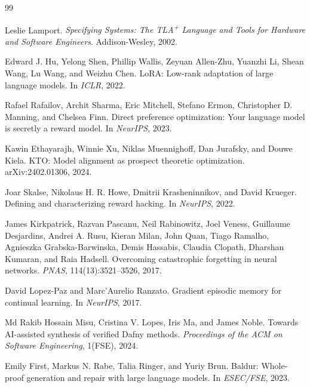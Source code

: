 \documentclass[11pt]{article}
\begin{document}

\begin{thebibliography}{99}

Leslie Lamport.
\newblock \emph{Specifying Systems: The TLA\textsuperscript{+} Language
and Tools for Hardware and Software Engineers}.
\newblock Addison-Wesley, 2002.

Edward J. Hu, Yelong Shen, Phillip Wallis, Zeyuan Allen-Zhu, Yuanzhi
Li, Shean Wang, Lu Wang, and Weizhu Chen.
\newblock LoRA: Low-rank adaptation of large language models.
\newblock In \emph{ICLR}, 2022.

Rafael Rafailov, Archit Sharma, Eric Mitchell, Stefano Ermon,
Christopher D. Manning, and Chelsea Finn.
\newblock Direct preference optimization: Your language model is
secretly a reward model.
\newblock In \emph{NeurIPS}, 2023.

Kawin Ethayarajh, Winnie Xu, Niklas Muennighoff, Dan Jurafsky, and
Douwe Kiela.
\newblock KTO: Model alignment as prospect theoretic optimization.
\newblock arXiv:2402.01306, 2024.

Joar Skalse, Nikolaus H. R. Howe, Dmitrii Krasheninnikov, and David
Krueger.
\newblock Defining and characterizing reward hacking.
\newblock In \emph{NeurIPS}, 2022.

James Kirkpatrick, Razvan Pascanu, Neil Rabinowitz, Joel Veness,
Guillaume Desjardins, Andrei A. Rusu, Kieran Milan, John Quan,
Tiago Ramalho, Agnieszka Grabska-Barwinska, Demis Hassabis, Claudia
Clopath, Dharshan Kumaran, and Raia Hadsell.
\newblock Overcoming catastrophic forgetting in neural networks.
\newblock \emph{PNAS}, 114(13):3521--3526, 2017.

David Lopez-Paz and Marc'Aurelio Ranzato.
\newblock Gradient episodic memory for continual learning.
\newblock In \emph{NeurIPS}, 2017.

Md Rakib Hossain Misu, Cristina V. Lopes, Iris Ma, and James Noble.
\newblock Towards AI-assisted synthesis of verified Dafny methods.
\newblock \emph{Proceedings of the ACM on Software Engineering},
1(FSE), 2024.

Emily First, Markus N. Rabe, Talia Ringer, and Yuriy Brun.
\newblock Baldur: Whole-proof generation and repair with large
language models.
\newblock In \emph{ESEC/FSE}, 2023.


\end{thebibliography}
\end{document}
